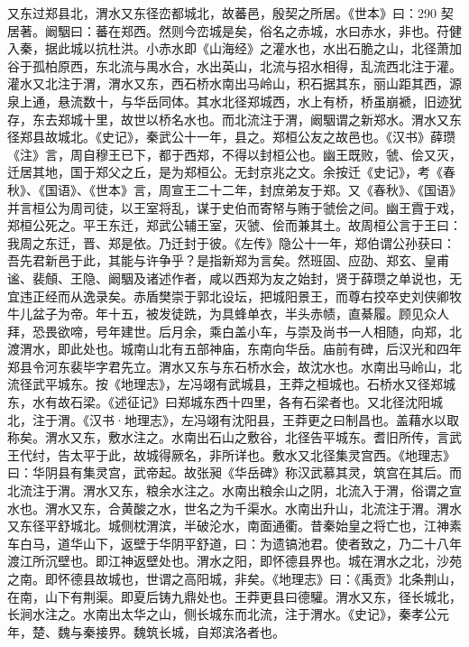 \documentclass[12pt,UTF8]{ctexbook}
\begin{document}
又东过郑县北，渭水又东径峦都城北，故蕃邑，殷契之所居。《世本》曰：290 契居著。阚駰曰：蕃在郑西。然则今峦城是矣，俗名之赤城，水曰赤水，非也。苻健入秦，据此城以抗杜洪。小赤水即《山海经》之灌水也，水出石脆之山，北径萧加谷于孤柏原西，东北流与禺水合，水出英山，北流与招水相得，乱流西北注于灌。灌水又北注于渭，渭水又东，西石桥水南出马岭山，积石据其东，丽山距其西，源泉上通，悬流数十，与华岳同体。其水北径郑城西，水上有桥，桥虽崩褫，旧迹犹存，东去郑城十里，故世以桥名水也。而北流注于渭，阚駰谓之新郑水。渭水又东径郑县故城北。《史记》，秦武公十一年，县之。郑桓公友之故邑也。《汉书》薛瓒《注》言，周自穆王已下，都于西郑，不得以封桓公也。幽王既败，虢、侩又灭，迁居其地，国于郑父之丘，是为郑桓公。无封京兆之文。余按迁《史记》，考《春秋》、《国语》、《世本》言，周宣王二十二年，封庶弟友于郑。又《春秋》、《国语》并言桓公为周司徒，以王室将乱，谋于史伯而寄帑与贿于虢侩之间。幽王霣于戏，郑桓公死之。平王东迁，郑武公辅王室，灭虢、侩而兼其土。故周桓公言于王曰：我周之东迁，晋、郑是依。乃迁封于彼。《左传》隐公十一年，郑伯谓公孙获曰：吾先君新邑于此，其能与许争乎？是指新郑为言矣。然班固、应劭、郑玄、皇甫谧、裴頠、王隐、阚駰及诸述作者，咸以西郑为友之始封，贤于薛瓒之单说也，无宜违正经而从逸录矣。赤盾樊崇于郭北设坛，把城阳景王，而尊右挍卒史刘侠卿牧牛儿盆子为帝。年十五，被发徒跣，为具蜂单衣，半头赤帻，直綦履。顾见众人拜，恐畏欲啼，号年建世。后月余，乘白盖小车，与崇及尚书一人相随，向郑，北渡渭水，即此处也。城南山北有五部神庙，东南向华岳。庙前有碑，后汉光和四年郑县令河东裴毕字君先立。渭水又东与东石桥水会，故沈水也。水南出马岭山，北流径武平城东。按《地理志》，左冯翊有武城县，王莽之桓城也。石桥水又径郑城东，水有故石梁。《述征记》曰郑城东西十四里，各有石梁者也。又北径沈阳城北，注于渭。《汉书·地理志》，左冯翊有沈阳县，王莽更之曰制昌也。盖藉水以取称矣。渭水又东，敷水注之。水南出石山之敷谷，北径告平城东。耆旧所传，言武王代纣，告太平于此，故城得厥名，非所详也。敷水又北径集灵宫西。《地理志》曰：华阴县有集灵宫，武帝起。故张昶《华岳碑》称汉武慕其灵，筑宫在其后。而北流注于渭。渭水又东，粮余水注之。水南出粮余山之阴，北流入于渭，俗谓之宣水也。渭水又东，合黄酸之水，世名之为千渠水。水南出升山，北流注于渭。渭水又东径平舒城北。城侧枕渭滨，半破沦水，南面通衢。昔秦始皇之将亡也，江神素车白马，道华山下，返壁于华阴平舒道，曰：为遗镐池君。使者致之，乃二十八年渡江所沉壁也。即江神返壁处也。渭水之阳，即怀德县界也。城在渭水之北，沙苑之南。即怀德县故城也，世谓之高阳城，非矣。《地理志》曰：《禹贡》北条荆山，在南，山下有荆渠。即夏后铸九鼎处也。王莽更县曰德驩。渭水又东，径长城北，长涧水注之。水南出太华之山，侧长城东而北流，注于渭水。《史记》，秦孝公元年，楚、魏与秦接界。魏筑长城，自郑滨洛者也。
\end{document}

